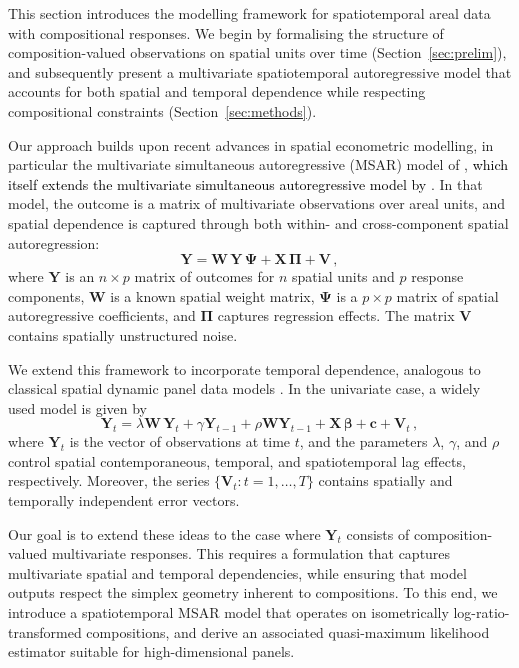 \documentclass[12pt]{article}
\theoremstyle{plain}
\theoremstyle{definition}
\newcommand{\xvec}{\boldsymbol}
\newcommand{\xmat}{\mathbf}
\begin{document}
This section introduces the modelling framework for spatiotemporal areal data with compositional responses. We begin by formalising the structure of composition-valued observations on spatial units over time (Section~\ref{sec:prelim}), and subsequently present a multivariate spatiotemporal autoregressive model that accounts for both spatial and temporal dependence while respecting compositional constraints (Section~\ref{sec:methods}).

Our approach builds upon recent advances in spatial econometric modelling, in particular the multivariate simultaneous autoregressive (MSAR) model of \citet{yang2017identification}, \textcolor{black}{which itself extends the multivariate simultaneous autoregressive model by \cite{Kelejian1998}}. In that model, the outcome is a matrix of multivariate observations over areal units, and spatial dependence is captured through both within- and cross-component spatial autoregression:
\begin{equation} \label{eq:initialbackground}
 	\xmat{Y}  =  \xmat{W}  \, \xmat{Y} \,  \xmat{\Psi}  + \xmat{X} \,  \xmat{\Pi} + \xmat{V}\, ,
\end{equation}
where \(\xmat{Y}\) is an \(n \times p\) matrix of outcomes for \(n\) spatial units and \(p\) response components, \(\xmat{W}\) is a known spatial weight matrix, \(\xmat{\Psi}\) is a \(p \times p\) matrix of spatial autoregressive coefficients, and \(\xmat{\Pi}\) captures regression effects. The matrix \(\xmat{V}\) contains spatially unstructured noise.

We extend this framework to incorporate temporal dependence, analogous to classical spatial dynamic panel data models \citep{Yu08}. In the univariate case, a widely used model is given by
\begin{equation} \label{eq:yu_model}
 	\xvec{Y}_t  =  \lambda \xmat{W}  \, \xvec{Y}_t +  \gamma \xvec{Y}_{t-1} +  \rho \xmat{W} \xvec{Y}_{t-1} + \xmat{X} \,  \xvec{\beta} + \xvec{c} + \xvec{V}_t\, ,
\end{equation}
where \(\xvec{Y}_t\) is the vector of observations at time \(t\), and the parameters \(\lambda\), \(\gamma\), and \(\rho\) control spatial contemporaneous, temporal, and spatiotemporal lag effects, respectively. Moreover, the series \(\{\xvec{V}_t: t = 1,\ldots, T\}\) contains spatially and temporally independent error vectors.

Our goal is to extend these ideas to the case where \(\xvec{Y}_t\) consists of composition-valued multivariate responses. This requires a formulation that captures multivariate spatial and temporal dependencies, while ensuring that model outputs respect the simplex geometry inherent to compositions. To this end, we introduce a spatiotemporal MSAR model that operates on isometrically log-ratio-transformed compositions, and derive an associated quasi-maximum likelihood estimator suitable for high-dimensional panels.
\end{document}
